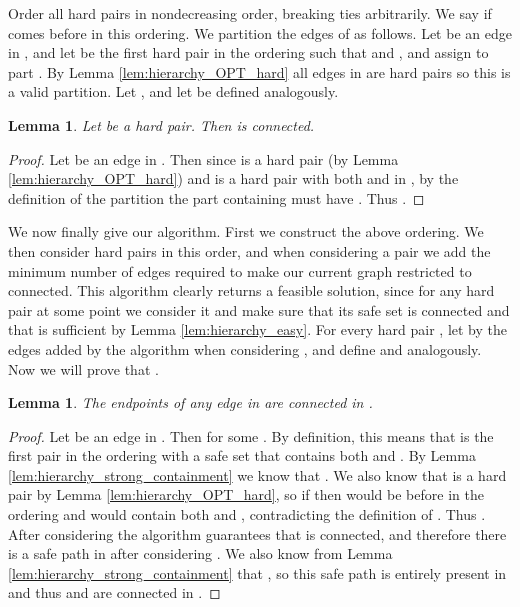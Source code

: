 \documentclass[11pt,letterpaper]{article}
\newtheorem{lemma}[theorem]{Lemma}
\theoremstyle{definition}
\begin{document}
Order all hard pairs in nondecreasing order, breaking ties
arbitrarily.  We say  if  comes before
 in this ordering.  We partition the edges of  as
follows.  Let  be an edge in , and let  be
the first hard pair in the ordering such that  and , and assign  to part .  By Lemma
\ref{lem:hierarchy_OPT_hard} all edges in  are hard pairs so this
is a valid partition.  Let , and let  be defined
analogously.

\begin{lemma} \label{lem:hierarchy_OPT_connected}
  Let  be a hard pair.  Then 
  is connected.
\end{lemma}
\begin{proof}
  Let  be an edge in .  Then since 
  is a hard pair (by Lemma \ref{lem:hierarchy_OPT_hard}) and 
  is a hard pair with both  and  in , by the definition
  of the partition the part  containing  must
  have .  Thus .
\end{proof}

We now finally give our algorithm.  First we construct the above
ordering.  We then consider hard pairs in this order, and when
considering a pair  we add the minimum number of edges
required to make our current graph restricted to  connected.
This algorithm clearly returns a feasible solution, since for any hard
pair  at some point we consider it and make sure that its
safe set is connected and that is sufficient by Lemma
\ref{lem:hierarchy_easy}.  For every hard pair , let
 by the edges added by the algorithm when considering
, and define  and  analogously.  Now we will
prove that .

\begin{lemma} \label{lem:hierarchy_OPT_ALG}
  The endpoints of any edge in  are
  connected in .
\end{lemma}
\begin{proof}
  Let  be an edge in .  Then
   for some .  By
  definition, this means that  is the first pair in the
  ordering with a safe set that contains both  and .  By Lemma
  \ref{lem:hierarchy_strong_containment} we know that .  We also know that  is a hard pair by
  Lemma \ref{lem:hierarchy_OPT_hard}, so if 
  then  would be before  in the ordering and would
  contain both  and , contradicting the definition of .
  Thus .  After considering  the algorithm
  guarantees that  is connected, and
  therefore there is a safe  path in  after considering
  .  We also know from Lemma
  \ref{lem:hierarchy_strong_containment} that , so this safe path is entirely present in  and thus  and  are connected in .
\end{proof}
\end{document}
